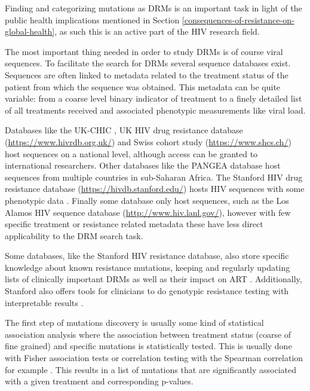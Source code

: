 \documentclass[
  11pt,
  twoside,
  BCOR=10mm,
  listof=totoc]{scrbook}
\begin{document}
Finding and categorizing mutations as DRMs is an important task in light of the public health implications mentioned in Section \ref{consequences-of-resistance-on-global-health}, as such this is an active part of the HIV research field.

The most important thing needed in order to study DRMs is of course viral sequences. To facilitate the search for DRMs several sequence databases exist. Sequences are often linked to metadata related to the treatment status of the patient from which the sequence was obtained. This metadata can be quite variable: from a coarse level binary indicator of treatment to a finely detailed list of all treatments received and associated phenotypic measurements like viral load.

Databases like the UK-CHIC \autocite{ukchicsteeringcommitteeCreationLargeUKbased2004}, UK HIV drug resistance database (\url{https://www.hivrdb.org.uk/}) and Swiss cohort study (\url{https://www.shcs.ch/}) host sequences on a national level, although access can be granted to international researchers. Other databases like the PANGEA database \autocite{abeler-dornerPANGEAHIVPhylogeneticsNetworks2019} host sequences from multiple countries in sub-Saharan Africa. The Stanford HIV drug resistance database (\url{https://hivdb.stanford.edu/}) hosts HIV sequences with some phenotypic data \autocite{rheeHumanImmunodeficiencyVirus2003,shaferRationaleUsesPublic2006}. Finally some database only host sequences, such as the Los Alamos HIV sequence database (\url{http://www.hiv.lanl.gov/}), however with few specific treatment or resistance related metadata \autocite{kuikenHIVSequenceDatabases2003} these have less direct applicability to the DRM search task.

Some databases, like the Stanford HIV resistance database, also store specific knowledge about known resistance mutations, keeping and regularly updating lists of clinically important DRMs as well as their impact on ART \autocite{wensing2019UpdateDrug2019,clarkMutationsRetroviralGenes2007}. Additionally, Stanford also offers tools for clinicians to do genotypic resistance testing with interpretable results \autocite{liuWebResourcesHIV2006d}.

The first step of mutations discovery is usually some kind of statistical association analysis\autocite{johnsonUpdateDrugResistance2016,wensing2019UpdateDrug2019} where the association between treatment status (coarse of fine grained) and specific mutations is statistically tested. This is usually done with Fisher association tests \autocite{villabona-arenasIndepthAnalysisHIV12016,shulmanGeneticCorrelatesEfavirenz2004} or correlation testing with the Spearman correlation for example \autocite{millerGenotypicPhenotypicPredictors2004}. This results in a list of mutations that are significantly associated with a given treatment and corresponding p-values.
\end{document}
